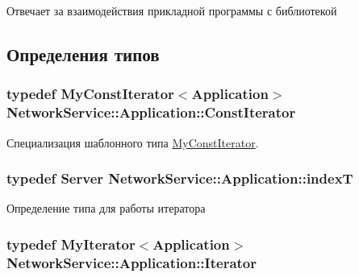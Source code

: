 Отвечает за взаимодействия прикладной программы с библиотекой 

\subsection{Определения типов}
\hypertarget{class_network_service_1_1_application_a51fff3b7cce6bf84c2edbd887c0cac45}{}
\subsubsection[{Const\+Iterator}]{\setlength{\rightskip}{0pt plus 5cm}typedef {\bf My\+Const\+Iterator}$<${\bf Application}$>$ {\bf Network\+Service\+::\+Application\+::\+Const\+Iterator}}\label{class_network_service_1_1_application_a51fff3b7cce6bf84c2edbd887c0cac45}


Специализация шаблонного типа \hyperlink{class_network_service_1_1_my_const_iterator}{My\+Const\+Iterator}. 

\hypertarget{class_network_service_1_1_application_a4cbe718a4ebf378cf75cc55fe015177a}{}
\subsubsection[{index\+T}]{\setlength{\rightskip}{0pt plus 5cm}typedef {\bf Server} {\bf Network\+Service\+::\+Application\+::index\+T}}\label{class_network_service_1_1_application_a4cbe718a4ebf378cf75cc55fe015177a}


Определение типа для работы итератора 

\hypertarget{class_network_service_1_1_application_a206937019d86d3391a209e9883b44f7b}{}
\subsubsection[{Iterator}]{\setlength{\rightskip}{0pt plus 5cm}typedef {\bf My\+Iterator}$<${\bf Application}$>$ {\bf Network\+Service\+::\+Application\+::\+Iterator}}\label{class_network_service_1_1_application_a206937019d86d3391a209e9883b44f7b}


